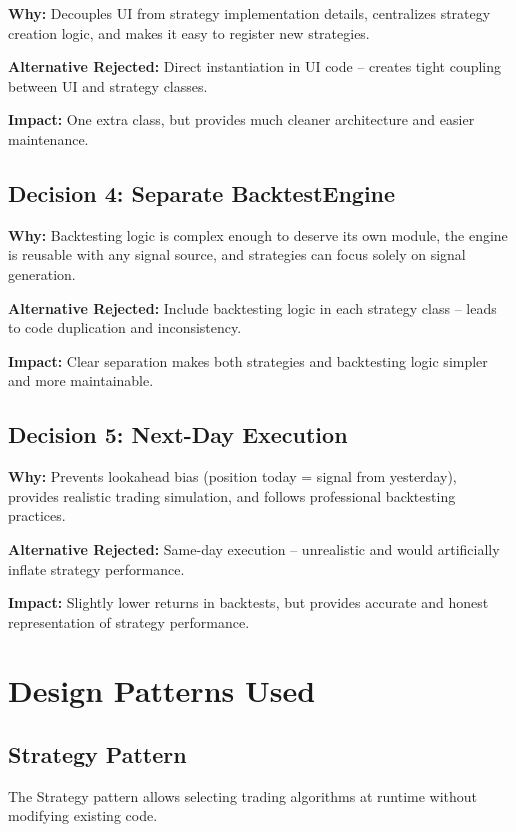 \documentclass[11pt,a4paper]{article}
\begin{document}
\textbf{Why:} Decouples UI from strategy implementation details, centralizes strategy creation logic, and makes it easy to register new strategies.

\textbf{Alternative Rejected:} Direct instantiation in UI code -- creates tight coupling between UI and strategy classes.

\textbf{Impact:} One extra class, but provides much cleaner architecture and easier maintenance.

\subsection{Decision 4: Separate BacktestEngine}

\textbf{Why:} Backtesting logic is complex enough to deserve its own module, the engine is reusable with any signal source, and strategies can focus solely on signal generation.

\textbf{Alternative Rejected:} Include backtesting logic in each strategy class -- leads to code duplication and inconsistency.

\textbf{Impact:} Clear separation makes both strategies and backtesting logic simpler and more maintainable.

\subsection{Decision 5: Next-Day Execution}

\textbf{Why:} Prevents lookahead bias (position today = signal from yesterday), provides realistic trading simulation, and follows professional backtesting practices.

\textbf{Alternative Rejected:} Same-day execution -- unrealistic and would artificially inflate strategy performance.

\textbf{Impact:} Slightly lower returns in backtests, but provides accurate and honest representation of strategy performance.

\newpage
\section{Design Patterns Used}

\subsection{Strategy Pattern}

The Strategy pattern allows selecting trading algorithms at runtime without modifying existing code.
\end{document}

